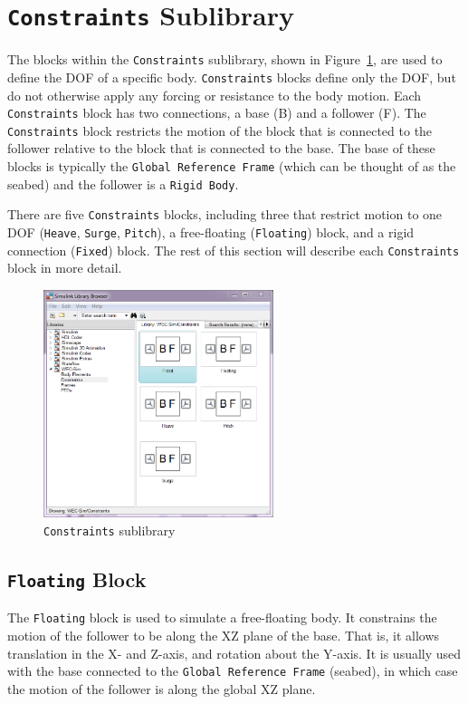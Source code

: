     \section{\texttt{Constraints} Sublibrary}
    The blocks within the \texttt{Constraints} sublibrary, shown in Figure~\ref{fig:cLib}, are used to 
    define the DOF of a specific body. \texttt{Constraints} blocks define only the DOF, but do not 
    otherwise apply any forcing or resistance to the body motion. Each \texttt{Constraints} block 
    has two connections, a base (B) and a follower (F). The \texttt{Constraints} block restricts the 
    motion of the block that is connected to the follower relative to the block that is connected to the base. 
    The base of these blocks is typically the \texttt{Global Reference Frame} (which can be thought of as 
    the seabed) and the follower is a \texttt{Rigid Body}. 
			  
    There are five \texttt{Constraints} blocks, including three that restrict motion to one 
	DOF (\texttt{Heave}, \texttt{Surge}, \texttt{Pitch}), a free-floating (\texttt{Floating}) 
	block, and a rigid connection (\texttt{Fixed}) block. 
	The rest of this section will describe each \texttt{Constraints} block in more detail.

	\begin{figure}[H]        
	\centering        
	\includegraphics[width=0.6\textwidth]{libraryStructure/figures/constraintsLib}        
	\caption{\texttt{Constraints} sublibrary}        
	\label{fig:cLib}        
	\end{figure}
	
        \subsection{\texttt{Floating} Block}
        The \texttt{Floating} block is used to simulate a free-floating body. It
		constrains the motion of the follower to be along the XZ plane of 
		the base. That is, it allows translation in the X- and 
		Z-axis, and rotation about the Y-axis. It  is usually used with the base 
		connected to the \texttt{Global Reference Frame} (seabed), in which 
		case the motion of the follower is along the global XZ plane. 

